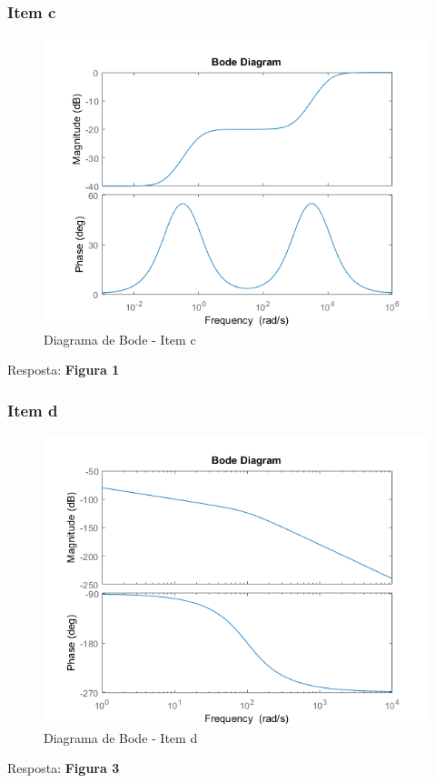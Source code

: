 \documentclass[a4paper, 12pt]{article}
\begin{document}
        \subsubsection{Item c}
		\begin{figure}[!ht]
			\centering
			\includegraphics{img/Q8c.png}
			\caption{Diagrama de Bode - Item c}	
		\end{figure}           
		Resposta: \textbf{Figura 1} 
		\newpage         
        \subsubsection{Item d}
		\begin{figure}[!ht]
			\centering
			\includegraphics{img/Q8d.png}
			\caption{Diagrama de Bode - Item d}	
		\end{figure}           
		Resposta: \textbf{Figura 3}        
\end{document}
